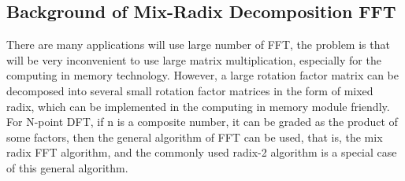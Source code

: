 \documentclass[journal]{IEEEtran}
\begin{document}
\subsection{Background of Mix-Radix Decomposition FFT}
There are many applications will use large number of FFT, the problem is
that will be very inconvenient to use large matrix multiplication, especially for the computing in memory technology. However, a large rotation factor matrix can be decomposed into several small rotation factor matrices in the form of mixed radix, which can be implemented in the computing in memory module friendly. For N-point DFT, if n is a composite number, it can be graded as the product of some factors, then the general algorithm of FFT can be used, that is, the mix radix FFT algorithm, and the commonly used radix-2 algorithm is a special case of this general algorithm.
\end{document}
